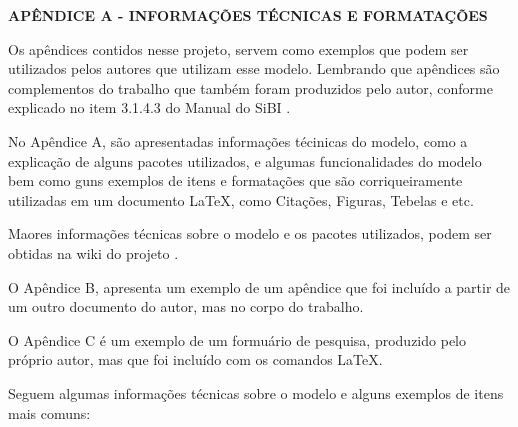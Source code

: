 \newpage
{}
{}
\begin{center}
\textbf{\MakeUppercase{Apêndice A - Informações técnicas e formatações}}
\end{center}

Os apêndices contidos nesse projeto, servem como exemplos que podem ser utilizados pelos autores que utilizam esse modelo. Lembrando que apêndices são complementos do trabalho que também foram produzidos pelo autor, conforme explicado no item 3.1.4.3 do Manual do SiBI \cite{ManualSibi2025}.

No Apêndice A, são apresentadas informações técinicas do modelo, como a explicação de alguns pacotes utilizados, e algumas funcionalidades do modelo bem como guns exemplos de itens e formatações que são corriqueiramente utilizadas em um documento {\LaTeX}, como Citações, Figuras, Tebelas e etc.

Maores informações técnicas sobre o modelo e os pacotes utilizados, podem ser obtidas na wiki do projeto \cite{wiki_jacurutu}.

O Apêndice B, apresenta um exemplo de um apêndice que foi incluído a partir de um outro documento do autor, mas no corpo do trabalho.

O Apêndice C é um exemplo de um formuário de pesquisa, produzido pelo próprio autor, mas que foi incluído com os comandos \LaTeX.

Seguem algumas informações técnicas sobre o modelo e alguns exemplos de itens mais comuns:

